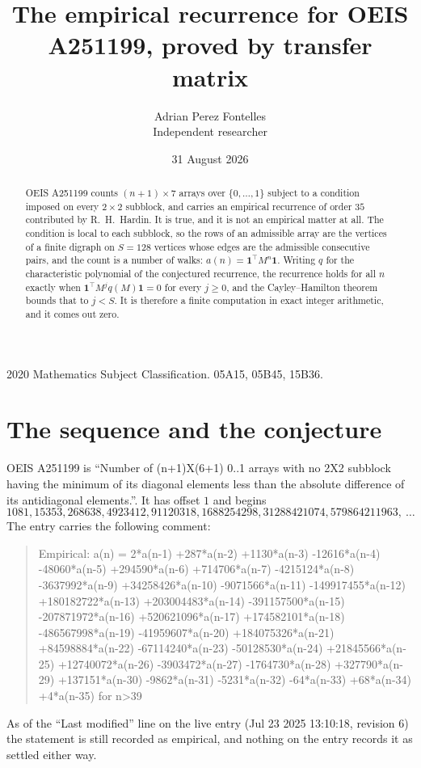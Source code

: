 \documentclass[11pt,a4paper]{article}
\title{The empirical recurrence for OEIS A251199, proved by transfer matrix}
\author{Adrian Perez Fontelles\\ \small Independent researcher}
\date{31 August 2026}
\theoremstyle{plain}
\theoremstyle{definition}
\begin{document}
\maketitle

\begin{abstract}
OEIS A251199 counts $(n+1)\times7$ arrays over $\{0,\dots,1\}$ subject to a condition imposed on
every $2\times2$ subblock, and carries an empirical recurrence of order $35$ contributed
by R.~H.~Hardin. It is true, and it is not an empirical matter at all. The condition is local
to each subblock, so the rows of an admissible array are the vertices of a finite digraph
on $S=128$ vertices whose edges are the admissible consecutive pairs, and the count is a
number of walks: $a(n)=\mathbf{1}^{\!\top}M^{n}\mathbf{1}$. Writing $q$
for the characteristic polynomial of the conjectured recurrence, the recurrence holds for all
$n$ exactly when $\mathbf{1}^{\!\top}M^{j}q(M)\mathbf{1}=0$ for every $j\ge0$, and the
Cayley--Hamilton theorem bounds that to $j<S$. It is therefore a finite computation in exact
integer arithmetic, and it comes out zero.
\end{abstract}

\noindent\small 2020 Mathematics Subject Classification. 05A15, 05B45, 15B36.\normalsize

\section{The sequence and the conjecture}

OEIS A251199 is ``Number of (n+1)X(6+1) 0..1 arrays with no 2X2 subblock having the minimum of its diagonal elements less than the absolute difference of its antidiagonal elements.''. It has offset $1$ and begins
\[
1081, 15353, 268638, 4923412, 91120318, 1688254298, 31288421074, 579864211963,\ \dots
\]
The entry carries the following comment:
\begin{quote}\small
Empirical: a(n) = 2*a(n-1) +287*a(n-2) +1130*a(n-3) -12616*a(n-4) -48060*a(n-5) +294590*a(n-6) +714706*a(n-7) -4215124*a(n-8) -3637992*a(n-9) +34258426*a(n-10) -9071566*a(n-11) -149917455*a(n-12) +180182722*a(n-13) +203004483*a(n-14) -391157500*a(n-15) -207871972*a(n-16) +520621096*a(n-17) +174582101*a(n-18) -486567998*a(n-19) -41959607*a(n-20) +184075326*a(n-21) +84598884*a(n-22) -67114240*a(n-23) -50128530*a(n-24) +21845566*a(n-25) +12740072*a(n-26) -3903472*a(n-27) -1764730*a(n-28) +327790*a(n-29) +137151*a(n-30) -9862*a(n-31) -5231*a(n-32) -64*a(n-33) +68*a(n-34) +4*a(n-35) for n>39
\end{quote}
As of the ``Last modified'' line on the live entry (Jul 23 2025 13:10:18, revision 6) the statement is
still recorded as empirical, and nothing on the entry records it as settled either way.
\end{document}
